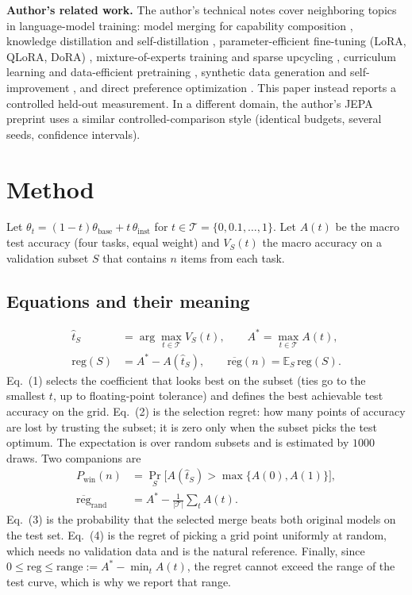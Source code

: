 \documentclass[conference]{IEEEtran}
\begin{document}
\textbf{Author's related work.} The author's technical notes cover neighboring topics in language-model training: model merging for capability composition \cite{santos2026modelmergingfo}, knowledge distillation and self-distillation \cite{santos2026knowledgedisti}, parameter-efficient fine-tuning (LoRA, QLoRA, DoRA) \cite{santos2026parametereffic}, mixture-of-experts training and sparse upcycling \cite{santos2026mixtureofexper}, curriculum learning and data-efficient pretraining \cite{santos2026curriculumlear}, synthetic data generation and self-improvement \cite{santos2026syntheticdatag}, and direct preference optimization \cite{santos2026directpreferen}. This paper instead reports a controlled held-out measurement. In a different domain, the author's JEPA preprint \cite{santos2026collapseresist} uses a similar controlled-comparison style (identical budgets, several seeds, confidence intervals).

\section{Method}
Let $\theta_t=(1-t)\theta_{\text{base}}+t\,\theta_{\text{inst}}$ for $t\in\mathcal{T}=\{0,0.1,\dots,1\}$. Let $A(t)$ be the macro test accuracy (four tasks, equal weight) and $V_S(t)$ the macro accuracy on a validation subset $S$ that contains $n$ items from each task.

\subsection*{Equations and their meaning}
\begin{align}
\hat t_S&=\arg\max_{t\in\mathcal{T}} V_S(t),\qquad A^\ast=\max_{t\in\mathcal{T}}A(t),\\
\mathrm{reg}(S)&=A^\ast-A(\hat t_S),\qquad \overline{\mathrm{reg}}(n)=\mathbb{E}_{S}\,\mathrm{reg}(S).
\end{align}
Eq.~(1) selects the coefficient that looks best on the subset (ties go to the smallest $t$, up to floating-point tolerance) and defines the best achievable test accuracy on the grid. Eq.~(2) is the selection regret: how many points of accuracy are lost by trusting the subset; it is zero only when the subset picks the test optimum. The expectation is over random subsets and is estimated by $1000$ draws. Two companions are
\begin{align}
P_{\mathrm{win}}(n)&=\Pr_S\!\big[A(\hat t_S)>\max\{A(0),A(1)\}\big],\\
\overline{\mathrm{reg}}_{\mathrm{rand}}&=A^\ast-\tfrac1{|\mathcal{T}|}\textstyle\sum_{t}A(t).
\end{align}
Eq.~(3) is the probability that the selected merge beats both original models on the test set. Eq.~(4) is the regret of picking a grid point uniformly at random, which needs no validation data and is the natural reference. Finally, since $0\le \mathrm{reg}\le \mathrm{range}:=A^\ast-\min_t A(t)$, the regret cannot exceed the range of the test curve, which is why we report that range.
\end{document}
